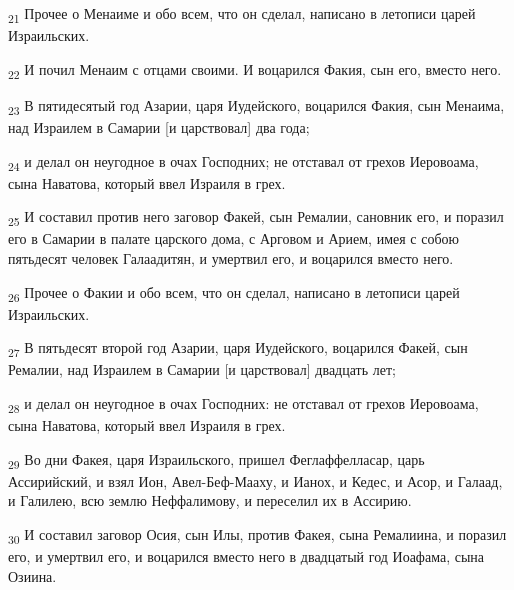 \begin{tcolorbox}
\textsubscript{21} Прочее о Менаиме и обо всем, что он сделал, написано в летописи царей Израильских.
\end{tcolorbox}
\begin{tcolorbox}
\textsubscript{22} И почил Менаим с отцами своими. И воцарился Факия, сын его, вместо него.
\end{tcolorbox}
\begin{tcolorbox}
\textsubscript{23} В пятидесятый год Азарии, царя Иудейского, воцарился Факия, сын Менаима, над Израилем в Самарии [и царствовал] два года;
\end{tcolorbox}
\begin{tcolorbox}
\textsubscript{24} и делал он неугодное в очах Господних; не отставал от грехов Иеровоама, сына Наватова, который ввел Израиля в грех.
\end{tcolorbox}
\begin{tcolorbox}
\textsubscript{25} И составил против него заговор Факей, сын Ремалии, сановник его, и поразил его в Самарии в палате царского дома, с Арговом и Арием, имея с собою пятьдесят человек Галаадитян, и умертвил его, и воцарился вместо него.
\end{tcolorbox}
\begin{tcolorbox}
\textsubscript{26} Прочее о Факии и обо всем, что он сделал, написано в летописи царей Израильских.
\end{tcolorbox}
\begin{tcolorbox}
\textsubscript{27} В пятьдесят второй год Азарии, царя Иудейского, воцарился Факей, сын Ремалии, над Израилем в Самарии [и царствовал] двадцать лет;
\end{tcolorbox}
\begin{tcolorbox}
\textsubscript{28} и делал он неугодное в очах Господних: не отставал от грехов Иеровоама, сына Наватова, который ввел Израиля в грех.
\end{tcolorbox}
\begin{tcolorbox}
\textsubscript{29} Во дни Факея, царя Израильского, пришел Феглаффелласар, царь Ассирийский, и взял Ион, Авел-Беф-Мааху, и Ианох, и Кедес, и Асор, и Галаад, и Галилею, всю землю Неффалимову, и переселил их в Ассирию.
\end{tcolorbox}
\begin{tcolorbox}
\textsubscript{30} И составил заговор Осия, сын Илы, против Факея, сына Ремалиина, и поразил его, и умертвил его, и воцарился вместо него в двадцатый год Иоафама, сына Озиина.
\end{tcolorbox}
